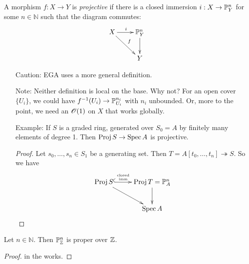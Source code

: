 \begin{definition}
A morphism $f:X\to Y$ is \emph{projective} if there is a closed
immersion $i:X\to \P^n_Y$ for some $n\in \mathbb{N}$ such that the
diagram commutes:
\[\xymatrix{
 X\ar[r]^i \ar[dr]^f & \P^n_Y\ar[d]\\
& Y }\]
\end{definition}
\begin{itemize}
 \item[Caution:] EGA uses a more general definition.

 \item[Note:] Neither definition is local on the base.  Why not?  For an
 open cover $\{U_i\}$, we could have $f^{-1}(U_i)\to
 \P^{n_i}_{U_i}$ with $n_i$ unbounded.  Or, more to the point, we
 need an $\O(1)$ on $X$ that works globally.

 \item[Example:] If $S$ is a graded ring, generated over $S_0=A$
 by finitely many elements of degree 1.  Then $\proj S \to \spec
 A$ is projective.
 \begin{proof}
 Let $s_0,\dots, s_n\in S_1$ be a generating set.  Then
 $T = A[t_0,\dots,t_n] \twoheadrightarrow S$.  So we have
 \[\xymatrix{
 \proj S \ar[dr] \ar@{^(->}[r]^(.4){\stack{\txt{\tiny closed}}{\txt{\tiny imm}}} & \proj T =
 \P^n_A \ar[d]\\
 & \spec A
 }\]
 \end{proof}
 \end{itemize}

\begin{lemma}
Let $n\in \mathbb{N}$.  Then $\P^n_{\Z}$ is proper over $\Z$.
\end{lemma}
\begin{proof}
in the works.
\renewcommand{\qedsymbol}{\text{\tiny proof continued in next lecture}}
\end{proof}
